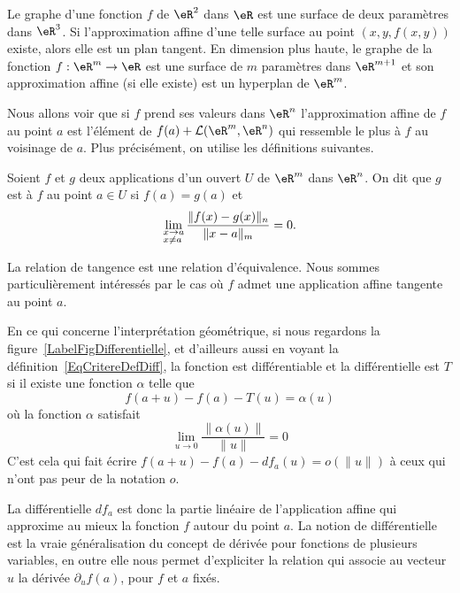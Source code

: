 Le graphe d'une fonction \( f\) de \( \eR^2\) dans \( \eR\) est une surface de deux paramètres dans \( \eR^3\). Si l'approximation affine d'une telle surface au point \( (x,y,f(x,y))\) existe, alors elle est un plan tangent. En dimension plus haute, le graphe de la fonction \( f:\eR^m\to\eR\) est une surface de \( m\) paramètres dans \( \eR^{m+1}\) et son approximation affine (si elle existe) est un hyperplan de \( \eR^m\).

Nous allons voir que si \( f\) prend ses valeurs dans \( \eR^n\) l'approximation affine de \( f\) au point \( a\) est l'élément de \(  f(a)+\mathcal{L}(\eR^m,\eR^n)\) qui ressemble le plus à \( f\) au voisinage de \( a\). Plus précisément, on utilise les définitions suivantes.
\begin{definition}
	Soient \( f\) et \( g\) deux applications d'un ouvert \( U\) de \( \eR^m\) dans \( \eR^n\). On dit que \( g\) est  à \( f\) au point \( a\in U\) si \( f(a)=g(a)\) et
	\[
		\lim_{\begin{subarray}{l}
				x\to a\\ x\neq a
			\end{subarray}}\frac{\|f(x)-g(x)\|_n}{\|x-a\|_m}=0.
	\]
\end{definition}
La relation de tangence est une relation d'équivalence. Nous sommes particulièrement intéressés par le cas où \( f\) admet une application  affine tangente au point \( a\).


\newcommand{\CaptionFigDifferentielle}{Interprétation géométrique de la différentielle.}

En ce qui concerne l'interprétation géométrique, si nous regardons la figure~\ref{LabelFigDifferentielle}, et d'ailleurs aussi en voyant la définition~\ref{EqCritereDefDiff}, la fonction est différentiable et la différentielle est \( T\) si il existe une fonction \( \alpha\) telle que
\begin{equation}
	f(a+u)-f(a)-T(u)=\alpha(u)
\end{equation}
où la fonction \( \alpha\) satisfait
\begin{equation}		\label{EqPresqueTa}
	\lim_{u\to 0} \frac{ \| \alpha(u)\| }{\| u \|}=0
\end{equation}
C'est cela qui fait écrire \( f(a+u)-f(a)-df_a(u)=o(\| u \|)\) à ceux qui n'ont pas peur de la notation \( o\).

La différentielle \( df_a\) est donc la partie linéaire de l'application affine qui approxime au mieux la fonction \( f\) autour du point \( a\). La notion de différentielle est la vraie généralisation du concept de dérivée pour fonctions de plusieurs variables, en outre elle nous permet d'expliciter la relation qui associe au vecteur \( u\) la dérivée \( \partial_u f(a)\), pour \( f\) et \( a\) fixés.

